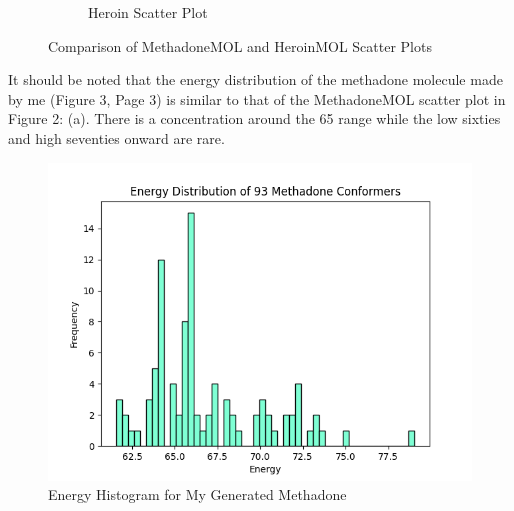 \documentclass[a4paper,10pt]{article}
\begin{document}
\begin{figure}[H]
\begin{subfigure}{0.45\textwidth}
        \caption{Heroin Scatter Plot}
        \label{fig:image2}
    \end{subfigure}
    \caption{Comparison of MethadoneMOL and HeroinMOL Scatter Plots}
    \label{fig:comparison}
\end{figure}

It should be noted that the energy distribution of the methadone molecule made by me (Figure 3, Page 3) is similar to that of the MethadoneMOL scatter plot in Figure 2: (a). There is a concentration around the 65 range while the low sixties and high seventies onward are rare.

\begin{figure}[H]
    \centering
    \includegraphics[width=0.5\linewidth]{imgs/Methadone_Energy_Histogram.png}
    \caption{Energy Histogram for My Generated Methadone }
    \label{fig:enter-label}
\end{figure}
\end{document}
